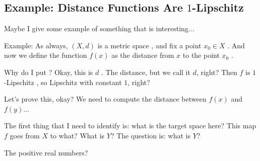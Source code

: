 \subsection{Example: Distance Functions Are \texorpdfstring{$1$}{1}-Lipschitz}

\begin{speech}[00:12:15 - 00:13:30]
Maybe I give some example of something that is interesting... 

Example:  As always, $(X, d)$ is a metric space , and fix a point $x_0 \in X$ . And now we define the function $f(x)$ as the distance from $x$ to the point $x_0$ .

Why do I put ? Okay, this is $d$ . The distance, but we call it $d$, right? Then $f$ is $1$-Lipschitz , so Lipschitz with constant $1$, right?
\end{speech}

\begin{speech}[00:13:30 - 00:14:31]
Let's prove this, okay? We need to compute the distance between $f(x)$ and $f(y)$... 

The first thing that I need to identify is: what is the target space here? This map $f$ goes from $X$ to what? What is $Y$? The question is: what is $Y$? 
\end{speech}

\begin{student}
The positive real numbers?
\end{student}

